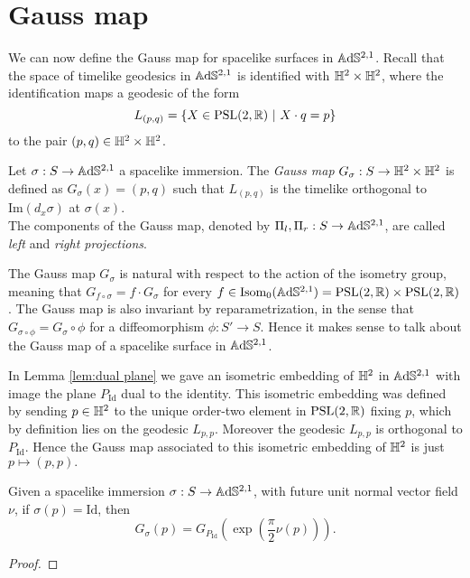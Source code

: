 \section{Gauss map}
We can now define the Gauss map for spacelike surfaces in $\mathbb{A}\mathrm{d}\mathbb{S}^{2,1}$. Recall that the space of timelike geodesics in $\mathbb{A}\mathrm{d}\mathbb{S}^{2,1}$ is identified with $\mathbb{H}^2\times\mathbb{H}^2$, where the identification maps a geodesic of the form
\[
    L_{(p,q)}=\{ X \in\text{PSL}(2,\mathbb{R}) \ | \ X \cdot q = p \}
\]
to the pair $(p,q) \in \mathbb{H}^2\times\mathbb{H}^2$. 
\begin{definition}
    Let $\sigma :S \to\mathbb{A}\mathrm{d}\mathbb{S}^{2,1}$ a spacelike immersion. The \textit{Gauss map} $G_\sigma : S \to \mathbb{H}^2 \times \mathbb{H}^2$ is defined as $G_\sigma(x) = (p,q)$ such that $L_{(p,q)}$ is the timelike orthogonal to $\text{Im}(d_x\sigma)$ at $\sigma(x)$.\\
    The components of the Gauss map, denoted by $\Pi_l, \Pi_r : S \to \mathbb{A}\mathrm{d}\mathbb{S}^{2,1}$, are called \textit{left} and \textit{right projections}. 
\end{definition}
The Gauss map $G_\sigma$ is natural with respect to the action of the isometry group, meaning that $G_{f\circ\sigma} = f \cdot G_\sigma$ for every $f \in\text{Isom}_0(\mathbb{A}\mathrm{d}\mathbb{S}^{2,1}) = \text{PSL}(2,\mathbb{R})\times\text{PSL}(2,\mathbb{R})$. The Gauss map is also invariant by reparametrization, in the sense that $G_{\sigma \circ \phi} = G_\sigma \circ \phi$ for a diffeomorphism $\phi:S'\to S$. Hence it makes sense to talk about the Gauss map of a spacelike surface in $\mathbb{A}\mathrm{d}\mathbb{S}^{2,1}$.

\begin{example}\label{ex:dual1}
    In Lemma \ref{lem:dual plane} we gave an isometric embedding of $\mathbb{H}^2$ in $\mathbb{A}\mathrm{d}\mathbb{S}^{2,1}$ with image the plane $P_{\text{Id}}$ dual to the identity. This isometric embedding was defined by sending $p\in\mathbb{H}^2$ to the unique order-two element in $\text{PSL}(2,\mathbb{R})$ fixing $p$, which by definition lies on the geodesic $L_{p,p}$. Moreover the geodesic $L_{p,p}$ is orthogonal to $P_{\text{Id}}$. Hence the Gauss map associated to this isometric embedding of $\mathbb{H}^2$ is just $p\mapsto (p,p).$
\end{example}

\begin{lemma}\label{lem:Gaussid}
    Given a spacelike immersion $\sigma:S\to\mathbb{A}\mathrm{d}\mathbb{S}^{2,1}$, with future unit normal vector field $\nu$, if $\sigma(p)=\text{Id}$, then 
    \begin{equation}\label{eq:Gaussid}
        G_\sigma(p)=G_{P_\text{Id}}(\exp(\frac{\pi}{2}\nu(p))).
    \end{equation}
\end{lemma}
\begin{proof}
\end{proof}

